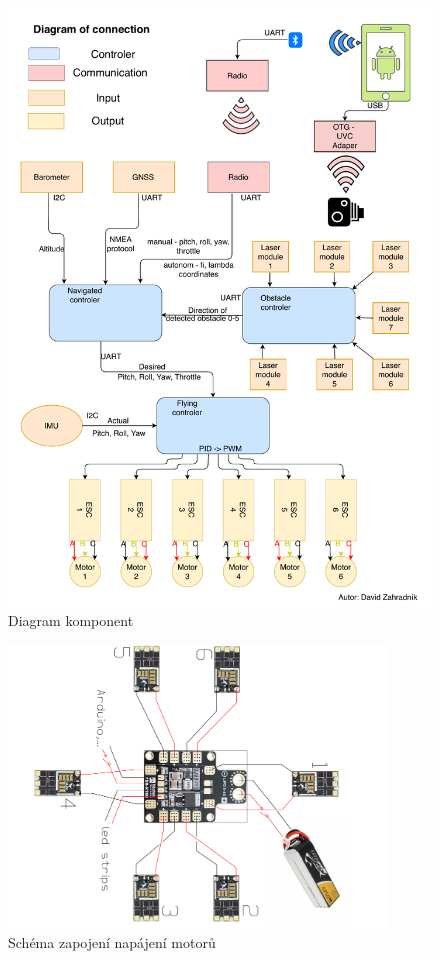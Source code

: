 \begin{figure}[h]
	\centering
	\includegraphics[width=15cm]{pictures/DroneDiagram.pdf}
	\caption{Diagram komponent}
\end{figure}
\begin{figure}[h]
	\centering
	\includegraphics[width=10cm, angle=90]{pictures/pdb_com.pdf}
	\caption{Schéma zapojení napájení motorů}
\end{figure}
